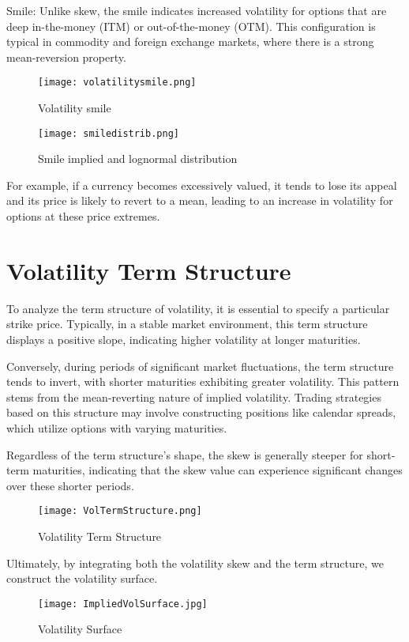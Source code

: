 \documentclass[a4paper,10pt]{article}
\begin{document}
Smile: Unlike skew, the smile indicates increased volatility for options that are deep in-the-money (ITM) or out-of-the-money (OTM). This configuration is typical in commodity and foreign exchange markets, where there is a strong mean-reversion property.\newline

\begin{figure}[htbp]
    \centering
    \texttt{[image: volatilitysmile.png]}
    \caption{Volatility smile}
    \label{fig:smile}
\end{figure}

\begin{figure}[htbp]
    \centering
    \texttt{[image: smiledistrib.png]}
    \caption{Smile implied and lognormal distribution}
    \label{fig:smiledistrib}
\end{figure}

For example, if a currency becomes excessively valued, it tends to lose its appeal and its price is likely to revert to a mean, leading to an increase in volatility for options at these price extremes.\newpage

\section{Volatility Term Structure}

To analyze the term structure of volatility, it is essential to specify a particular strike price. Typically, in a stable market environment, this term structure displays a positive slope, indicating higher volatility at longer maturities.\newline

Conversely, during periods of significant market fluctuations, the term structure tends to invert, with shorter maturities exhibiting greater volatility. This pattern stems from the mean-reverting nature of implied volatility. Trading strategies based on this structure may involve constructing positions like calendar spreads, which utilize options with varying maturities. \newline

Regardless of the term structure's shape, the skew is generally steeper for short-term maturities, indicating that the skew value can experience significant changes over these shorter periods.\newline

\begin{figure}[htbp]
    \centering
    \texttt{[image: VolTermStructure.png]}
    \caption{Volatility Term Structure}
    \label{fig:voltermstruc}
\end{figure}\newpage

Ultimately, by integrating both the volatility skew and the term structure, we construct the volatility surface.\newline

\begin{figure}[htbp]
    \centering
    \texttt{[image: ImpliedVolSurface.jpg]}
    \caption{Volatility Surface}
    \label{fig:voltermstruc}
\end{figure}\
\end{document}
